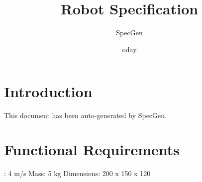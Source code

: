 \documentclass{article}
\title{Robot Specification}
\author{SpecGen}
\date{	oday}
\begin{document}
\maketitle
\section{Introduction}
This document has been auto-generated by SpecGen.
\section{Functional Requirements}
\Speed: 4 m/s
Mass: 5 kg
Dimensions: 200 x 150 x 120
\end{document}
